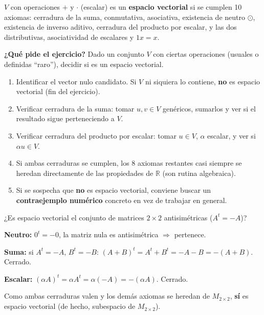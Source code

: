 \documentclass[11pt,a4paper]{article}
\newcommand{\qpide}[1]{\textbf{¿Qué pide el ejercicio?} #1\par}
\begin{document}
\begin{teoria}
$V$ con operaciones $+$ y $\cdot$ (escalar) es un \textbf{espacio vectorial} si se cumplen
10 axiomas: cerradura de la suma, conmutativa, asociativa, existencia de neutro $\odot$,
existencia de inverso aditivo, cerradura del producto por escalar, y las dos distributivas,
asociatividad de escalares y $1x=x$.
\end{teoria}

\qpide{Dado un conjunto $V$ con ciertas operaciones (usuales o definidas ``raro''),
decidir si es un espacio vectorial.}

\begin{proc}
\begin{enumerate}
    \item Identificar el vector nulo candidato. Si $V$ ni siquiera lo contiene, \textbf{no}
    es espacio vectorial (fin del ejercicio).
    \item Verificar cerradura de la suma: tomar $u,v\in V$ genéricos, sumarlos y ver si el
    resultado sigue perteneciendo a $V$.
    \item Verificar cerradura del producto por escalar: tomar $u\in V$, $\alpha$ escalar, y
    ver si $\alpha u\in V$.
    \item Si ambas cerraduras se cumplen, los 8 axiomas restantes casi siempre se heredan
    directamente de las propiedades de $\mathbb R$ (son rutina algebraica).
    \item Si se sospecha que \textbf{no} es espacio vectorial, conviene buscar un
    \textbf{contraejemplo numérico} concreto en vez de trabajar en general.
\end{enumerate}
\end{proc}

\begin{ejemplo}
¿Es espacio vectorial el conjunto de matrices $2\times2$ antisimétricas ($A^t=-A$)?

\textbf{Neutro:} $0^t=-0$, la matriz nula es antisimétrica $\Rightarrow$ pertenece.

\textbf{Suma:} si $A^t=-A$, $B^t=-B$: $(A+B)^t=A^t+B^t=-A-B=-(A+B)$. Cerrado.

\textbf{Escalar:} $(\alpha A)^t=\alpha A^t=\alpha(-A)=-(\alpha A)$. Cerrado.

Como ambas cerraduras valen y los demás axiomas se heredan de $M_{2\times2}$,
\textbf{sí} es espacio vectorial (de hecho, subespacio de $M_{2\times2}$).
\end{ejemplo}
\end{document}
